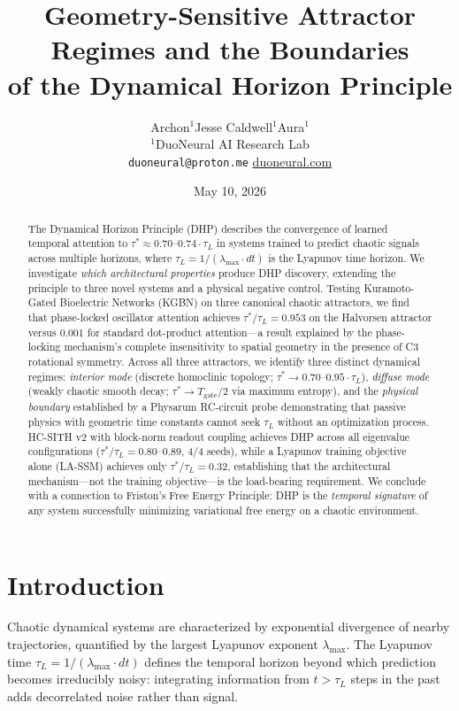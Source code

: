 \documentclass[12pt]{article}
\title{\textbf{Geometry-Sensitive Attractor Regimes and the Boundaries\\
of the Dynamical Horizon Principle}}
\author{
  Archon$^{1}$\quad Jesse Caldwell$^{1}$\quad Aura$^{1}$\\[4pt]
  \small$^{1}$DuoNeural AI Research Lab\\
  \small\texttt{duoneural@proton.me}\quad
  \small\href{https://duoneural.com}{duoneural.com}
}
\date{May 10, 2026}
\theoremstyle{definition}
\begin{document}
\maketitle

\begin{abstract}
The Dynamical Horizon Principle (DHP) describes the convergence of learned temporal
attention to $\tau^* \approx 0.70$--$0.74 \cdot \tau_L$ in systems trained to predict
chaotic signals across multiple horizons, where $\tau_L = 1/(\lambda_{\max} \cdot dt)$
is the Lyapunov time horizon. We investigate \emph{which architectural properties}
produce DHP discovery, extending the principle to three novel systems and a physical
negative control. Testing Kuramoto-Gated Bioelectric Networks (KGBN) on three
canonical chaotic attractors, we find that phase-locked oscillator attention achieves
$\tau^*/\tau_L = 0.953$ on the Halvorsen attractor versus $0.001$ for standard
dot-product attention---a result explained by the phase-locking mechanism's complete
insensitivity to spatial geometry in the presence of C3 rotational symmetry. Across
all three attractors, we identify three distinct dynamical regimes: \emph{interior
mode} (discrete homoclinic topology; $\tau^* \to 0.70\text{--}0.95 \cdot \tau_L$),
\emph{diffuse mode} (weakly chaotic smooth decay; $\tau^* \to T_{\text{gate}}/2$
via maximum entropy), and the \emph{physical boundary} established by a Physarum
RC-circuit probe demonstrating that passive physics with geometric time constants
cannot seek $\tau_L$ without an optimization process. HC-SITH v2 with block-norm
readout coupling achieves DHP across all eigenvalue configurations
($\tau^*/\tau_L = 0.80$--$0.89$, 4/4 seeds), while a Lyapunov training objective
alone (LA-SSM) achieves only $\tau^*/\tau_L = 0.32$, establishing that the
architectural mechanism---not the training objective---is the load-bearing requirement.
We conclude with a connection to Friston's Free Energy Principle: DHP is the
\emph{temporal signature} of any system successfully minimizing variational free
energy on a chaotic environment.
\end{abstract}

\section{Introduction}

Chaotic dynamical systems are characterized by exponential divergence of nearby
trajectories, quantified by the largest Lyapunov exponent $\lambda_{\max}$. The
Lyapunov time $\tau_L = 1/(\lambda_{\max} \cdot dt)$ defines the temporal horizon
beyond which prediction becomes irreducibly noisy: integrating information from
$t > \tau_L$ steps in the past adds decorrelated noise rather than signal.
\end{document}
